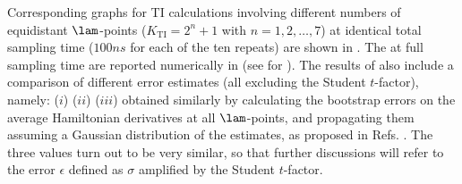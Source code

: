 Corresponding graphs for TI calculations involving different numbers of equidistant $\lam$-points
($K_{\mathrm{TI}}=2^n+1$ with $n=1,2,\dots,7$) at identical total sampling time 
($100\unit{ns}$ for each of the ten repeats) are shown in .
%
The  at full sampling time are reported numerically in  
(see  for ). 
The results of  also include a comparison of different error estimates
(all excluding the Student $t$-factor), namely:
($i$) 
($ii$) 
($iii$)  obtained similarly 
            by calculating the bootstrap errors on the average Hamiltonian derivatives 
            at all $\lam$-points, and propagating them assuming a Gaussian distribution of 
            the estimates, as proposed in Refs. .
%
The three values turn out to be very similar, so that further discussions 
will refer to the error $\epsilon$ defined as $\sigma$ amplified by the Student $t$-factor.
%


